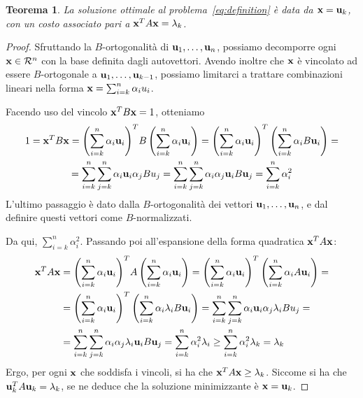 \documentclass[10pt,a4paper]{article}
\newtheorem{theorem}{Teorema}[section]
\newtheorem{proof}{Dimostrazione}[section]
\begin{document}
\begin{theorem}\label{thr:soluzione_ottimizzazione}
    La soluzione ottimale al problema~\eqref{eq:definition} è data da \(\vb{x}=\vb{u}_k\), con un costo associato pari a \(\vb{x}^T A \vb{x} = \lambda_k\).
\end{theorem}
\begin{proof}
    Sfruttando la \(B\)-ortogonalità di \(\vb{u}_1,\ldots,\vb{u}_n\), possiamo decomporre ogni \(\vb{x} \in \mathcal{R}^n\) con la base definita dagli autovettori. Avendo inoltre che \(\vb{x}\) è vincolato ad essere \(B\)-ortogonale a \(\vb{u}_1,\ldots,\vb{u}_{k-1}\), possiamo limitarci a trattare combinazioni lineari nella forma \(\vb{x} = \sum_{i=k}^n \alpha_i u_i\).

    Facendo uso del vincolo \(\vb{x}^T B\vb{x} = 1\), otteniamo
    \begin{multline}
        1 = \vb{x}^T B\vb{x} = {\left(\sum_{i=k}^n \alpha_i \vb{u}_i\right)}^T B \left(\sum_{i=k}^n \alpha_i \vb{u}_i\right) = {\left(\sum_{i=k}^n \alpha_i \vb{u}_i\right)}^T \left(\sum_{i=k}^n \alpha_i B \vb{u}_i\right) = \\
        = \sum_{i=k}^n\sum_{j=k}^n \alpha_i \vb{u}_i \alpha_j B u_j = \sum_{i=k}^n\sum_{j=k}^n \alpha_i \alpha_j \vb{u}_i B \vb{u}_j = \sum_{i=k}^n \alpha_i^2
    \end{multline}
    L'ultimo passaggio è dato dalla \(B\)-ortogonalità dei vettori \(\vb{u}_1,\ldots,\vb{u}_n\), e dal definire questi vettori come \(B\)-normalizzati.

    Da qui, \(\sum_{i=k}^n \alpha_i^2\).
    Passando poi all'espansione della forma quadratica \(\vb{x}^T A \vb{x}\):
    \begin{align}
        \vb{x}^T A \vb{x} &= {\left(\sum_{i=k}^n \alpha_i \vb{u}_i\right)}^T A \left(\sum_{i=k}^n \alpha_i \vb{u}_i\right) = {\left(\sum_{i=k}^n \alpha_i \vb{u}_i\right)}^T \left(\sum_{i=k}^n \alpha_i A \vb{u}_i\right) = \\
        &= {\left(\sum_{i=k}^n \alpha_i \vb{u}_i\right)}^T \left(\sum_{i=k}^n \alpha_i \lambda_i B \vb{u}_i\right) = \sum_{i=k}^n\sum_{j=k}^n \alpha_i \vb{u}_i \alpha_j \lambda_i B u_j = \\
        &= \sum_{i=k}^n\sum_{j=k}^n \alpha_i\alpha_j \lambda_i\vb{u}_i B \vb{u}_j = \sum_{i=k}^n \alpha_i^2 \lambda_i \geq \sum_{i=k}^n \alpha_i^2 \lambda_k = \lambda_k
    \end{align}
    Ergo, per ogni \(\vb{x}\) che soddisfa i vincoli, si ha che \(\vb{x}^T A \vb{x} \geq \lambda_k\). Siccome si ha che \(\vb{u}_k^T A \vb{u}_k = \lambda_k\), se ne deduce che la soluzione minimizzante è \(\vb{x} = \vb{u}_k\).
\end{proof}
\end{document}

